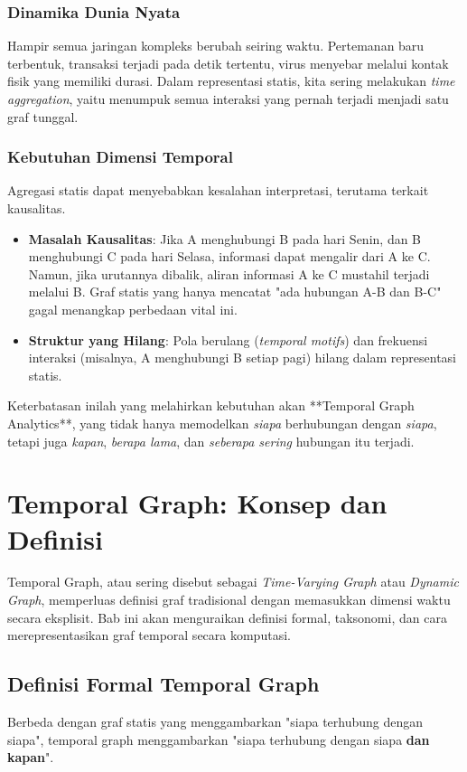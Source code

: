 \documentclass[12pt,a4paper]{book}
\begin{document}
\subsection{Dinamika Dunia Nyata}
Hampir semua jaringan kompleks berubah seiring waktu. Pertemanan baru terbentuk, transaksi terjadi pada detik tertentu, virus menyebar melalui kontak fisik yang memiliki durasi. Dalam representasi statis, kita sering melakukan \textit{time aggregation}, yaitu menumpuk semua interaksi yang pernah terjadi menjadi satu graf tunggal.

\subsection{Kebutuhan Dimensi Temporal}
Agregasi statis dapat menyebabkan kesalahan interpretasi, terutama terkait kausalitas.
\begin{itemize}
    \item \textbf{Masalah Kausalitas}: Jika A menghubungi B pada hari Senin, dan B menghubungi C pada hari Selasa, informasi dapat mengalir dari A ke C. Namun, jika urutannya dibalik, aliran informasi A ke C mustahil terjadi melalui B. Graf statis yang hanya mencatat "ada hubungan A-B dan B-C" gagal menangkap perbedaan vital ini.
    \item \textbf{Struktur yang Hilang}: Pola berulang (\textit{temporal motifs}) dan frekuensi interaksi (misalnya, A menghubungi B setiap pagi) hilang dalam representasi statis.
\end{itemize}

Keterbatasan inilah yang melahirkan kebutuhan akan **Temporal Graph Analytics**, yang tidak hanya memodelkan \textit{siapa} berhubungan dengan \textit{siapa}, tetapi juga \textit{kapan}, \textit{berapa lama}, dan \textit{seberapa sering} hubungan itu terjadi.

\chapter{Temporal Graph: Konsep dan Definisi}
Temporal Graph, atau sering disebut sebagai \textit{Time-Varying Graph} atau \textit{Dynamic Graph}, memperluas definisi graf tradisional dengan memasukkan dimensi waktu secara eksplisit. Bab ini akan menguraikan definisi formal, taksonomi, dan cara merepresentasikan graf temporal secara komputasi.

\section{Definisi Formal Temporal Graph}
Berbeda dengan graf statis yang menggambarkan "siapa terhubung dengan siapa", temporal graph menggambarkan "siapa terhubung dengan siapa \textbf{dan kapan}".
\end{document}

